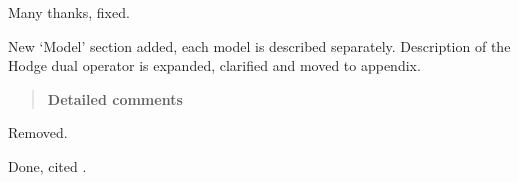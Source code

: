 \documentclass{article}
\begin{document}
Many thanks, fixed.
\begin{quotation}
\begin{comment}
\item Model description in section 3: Since this paper not only compares the orography treatment but also the accuracy of some numerical methods it needs to provide more information about these numerical variants.  E.g. there is no information about the `centered linear' finite-volume scheme, not even a reference.  Is the linear scheme 2nd-order accurate and the cubic scheme 4th-order accurate?  In addition, it is unclear what method the nonlinear steady-state test at rest and the gravity wave test used (the cubic option?).  Include a short description of the linear scheme, the cubic scheme and the fourth-order scheme from \cite{schaer2002} since the manuscript emphasises these aspects in combination with the orography treatment.

The description of the Hodge dual operator is incomprehensible in its current form and does not seem to be crucial for the assessment of the orography analysis.  I suggest moving this description into an appendix and extending it somewhat to make it self-explanatory.  Currently, it is very confusing to read about a semi-implicit formulation, and see the explicit Runge-Kutta time stepping algorithm in the next paragraph.
\end{comment}
\end{quotation}
New `Model' section added, each model is described separately.  Description of the Hodge dual operator is expanded, clarified and moved to appendix.

\begin{quotation}
\noindent
\textbf{Detailed comments}

\begin{comment}
\setcounter{commenti}{0}
\item Line 21: The Scorer parameter and Froude number are mentioned in the abstract, but never again in the manuscript.  Either remove this sentence from the abstract, or add the missing discussion why larger Scorer parameters and Froude numbers are a challenge for the cut cell method.  This is not obvious.
\end{comment}
\end{quotation}
Removed.

\begin{quotation}
\begin{comment}
\item Line 33: another way of treating orography are `immersed boundary methods' or `embedded boundary methods'.  Please add this information including a reference.
\end{comment}
\end{quotation}
Done, cited \citet{simon2012}.
\end{document}
